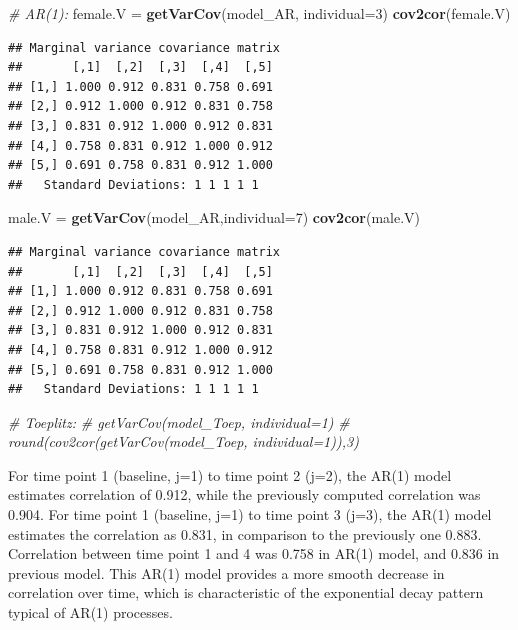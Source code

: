 \documentclass[
]{article}
\newenvironment{Shaded}{\begin{snugshade}}{\end{snugshade}}
\newcommand{\AttributeTok}[1]{\textcolor[rgb]{0.13,0.29,0.53}{#1}}
\newcommand{\CommentTok}[1]{\textcolor[rgb]{0.56,0.35,0.01}{\textit{#1}}}
\newcommand{\DecValTok}[1]{\textcolor[rgb]{0.00,0.00,0.81}{#1}}
\newcommand{\FunctionTok}[1]{\textcolor[rgb]{0.13,0.29,0.53}{\textbf{#1}}}
\newcommand{\NormalTok}[1]{#1}
\newcommand{\OtherTok}[1]{\textcolor[rgb]{0.56,0.35,0.01}{#1}}
\begin{document}
\begin{Shaded}
\begin{Highlighting}[]
\CommentTok{\# AR(1): }
\NormalTok{female.V }\OtherTok{=} \FunctionTok{getVarCov}\NormalTok{(model\_AR, }\AttributeTok{individual=}\DecValTok{3}\NormalTok{)}
\FunctionTok{cov2cor}\NormalTok{(female.V)}
\end{Highlighting}
\end{Shaded}

\begin{verbatim}
## Marginal variance covariance matrix
##       [,1]  [,2]  [,3]  [,4]  [,5]
## [1,] 1.000 0.912 0.831 0.758 0.691
## [2,] 0.912 1.000 0.912 0.831 0.758
## [3,] 0.831 0.912 1.000 0.912 0.831
## [4,] 0.758 0.831 0.912 1.000 0.912
## [5,] 0.691 0.758 0.831 0.912 1.000
##   Standard Deviations: 1 1 1 1 1
\end{verbatim}

\begin{Shaded}
\begin{Highlighting}[]
\NormalTok{male.V }\OtherTok{=} \FunctionTok{getVarCov}\NormalTok{(model\_AR,}\AttributeTok{individual=}\DecValTok{7}\NormalTok{)}
\FunctionTok{cov2cor}\NormalTok{(male.V)}
\end{Highlighting}
\end{Shaded}

\begin{verbatim}
## Marginal variance covariance matrix
##       [,1]  [,2]  [,3]  [,4]  [,5]
## [1,] 1.000 0.912 0.831 0.758 0.691
## [2,] 0.912 1.000 0.912 0.831 0.758
## [3,] 0.831 0.912 1.000 0.912 0.831
## [4,] 0.758 0.831 0.912 1.000 0.912
## [5,] 0.691 0.758 0.831 0.912 1.000
##   Standard Deviations: 1 1 1 1 1
\end{verbatim}

\begin{Shaded}
\begin{Highlighting}[]
\CommentTok{\# Toeplitz: }
\CommentTok{\# getVarCov(model\_Toep, individual=1)}
\CommentTok{\# round(cov2cor(getVarCov(model\_Toep, individual=1)),3)}
\end{Highlighting}
\end{Shaded}

For time point 1 (baseline, j=1) to time point 2 (j=2), the AR(1) model
estimates correlation of 0.912, while the previously computed
correlation was 0.904. For time point 1 (baseline, j=1) to time point 3
(j=3), the AR(1) model estimates the correlation as 0.831, in comparison
to the previously one 0.883. Correlation between time point 1 and 4 was
0.758 in AR(1) model, and 0.836 in previous model. This AR(1) model
provides a more smooth decrease in correlation over time, which is
characteristic of the exponential decay pattern typical of AR(1)
processes.
\end{document}
